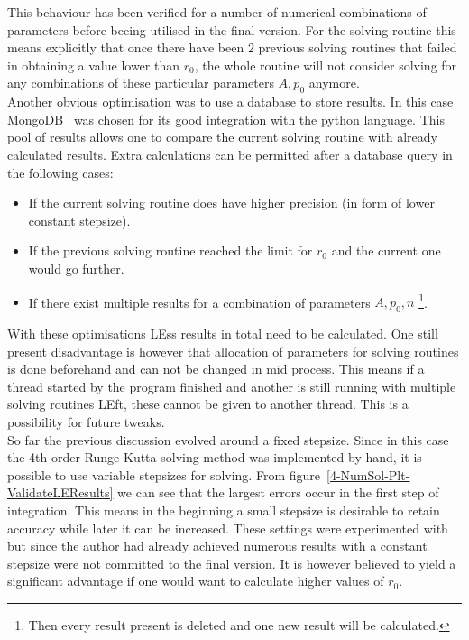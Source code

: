 \begin{appendix}
\begin{section}
This behaviour has been verified for a number of numerical combinations of parameters before beeing utilised in the final version.
For the solving routine this means explicitly that once there have been $2$ previous solving routines that failed in obtaining a value lower than $r_0$, the whole routine will not consider solving for any combinations of these particular parameters $A,p_0$ anymore.\\
Another obvious optimisation was to use a database to store results.
In this case MongoDB~\cite{dirolfPymongo11Python2021} was chosen for its good integration with the python language. 
This pool of results allows one to compare the current solving routine with already calculated results.
Extra calculations can be permitted after a database query in the following cases:
\begin{itemize}
	\item If the current solving routine does have higher precision (in form of lower constant stepsize).
	\item If the previous solving routine reached the limit for $r_0$ and the current one would go further.
	\item If there exist multiple results for a combination of parameters $A,p_0,n$ \footnote{Then every result present is deleted and one new result will be calculated.}.
\end{itemize}
With these optimisations \ac{LE}ss results in total need to be calculated.
One still present disadvantage is however that allocation of parameters for solving routines is done beforehand and can not be changed in mid process.
This means if a thread started by the program finished and another is still running with multiple solving routines \ac{LE}ft, these cannot be given to another thread.
This is a possibility for future tweaks.\\
So far the previous discussion evolved around a fixed stepsize.
Since in this case the 4th order Runge Kutta solving method was implemented by hand, it is possible to use variable stepsizes for solving.
From figure~\ref{4-NumSol-Plt-ValidateLEResults} we can see that the largest errors occur in the first step of integration. 
This means in the beginning a small stepsize is desirable to retain accuracy while later it can be increased. 
These settings were experimented with but since the author had already achieved numerous results with a constant stepsize were not committed to the final version.
It is however believed to yield a significant advantage if one would want to calculate higher values of $r_0$.
\end{section}
\end{appendix}
